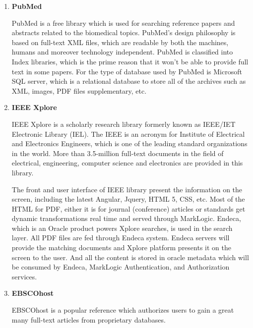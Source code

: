 \begin{enumerate}
	
	\item\textbf{PubMed}
	\setlength{\parindent}{1em}
		
	 PubMed is a free library which is used for searching reference papers and abstracts related to the biomedical topics.
	 PubMed’s design philosophy is based on full-text XML files, which are readable by both the machines, humans and moreover technology independent.
	 PubMed is classified into Index libraries, which is the prime reason that it won’t be able to provide full text in some papers.
	 For the type of database used by PubMed is Microsoft SQL server, which is a relational database to store all of the archives such as XML, images, PDF files supplementary, etc. 
		
	\item\textbf{IEEE Xplore}
	\setlength{\parindent}{1em}
	
	IEEE Xplore is a scholarly research library formerly known as IEEE/IET Electronic Library (IEL).
	The IEEE is an acronym for Institute of Electrical and Electronics Engineers, which is one of the leading standard organizations in the world.
	More than 3.5-million full-text documents in the field of electrical, engineering, computer science and electronics are provided in this library. 
	
	The front and user interface of IEEE library present the information on the screen, including the latest Angular, Jquery, HTML 5, CSS, etc. 
	Most of the HTML for PDF, either it is for journal (conference) articles or standards get dynamic transformations real time and served through MarkLogic.
	Endeca, which is an Oracle product powers Xplore searches, is used in the search layer.
	All PDF files are fed through Endeca system.
	Endeca servers will provide the matching documents and Xplore platform presents it on the screen to the user.
	And all the content is stored in oracle metadata which will be consumed by Endeca, MarkLogic Authentication, and Authorization services.
	
	\item\textbf{EBSCOhost}
	\setlength{\parindent}{1em}
	
	EBSCOhost is a popular reference which authorizes users to gain a great many full-text articles from proprietary databases.
	

\end{enumerate}
